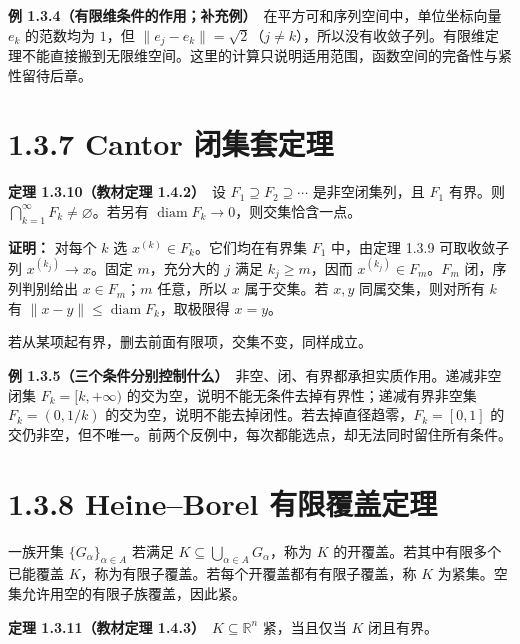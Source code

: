 \documentclass[11pt,a4paper]{article}
\begin{document}
\textbf{例
1.3.4（有限维条件的作用；补充例）}　在平方可和序列空间中，单位坐标向量
\(e_k\) 的范数均为 \(1\)，但
\(\|e_j-e_k\|=\sqrt2\)（\(j\ne k\)），所以没有收敛子列。有限维定理不能直接搬到无限维空间。这里的计算只说明适用范围，函数空间的完备性与紧性留待后章。

\section[\S{}1.3.7 Cantor
闭集套定理]{1.3.7 Cantor
闭集套定理}\label{cantor-ux95edux96c6ux5957ux5b9aux7406}

\textbf{定理 1.3.10（教材定理 1.4.2）}　设
\(F_1\supseteq F_2\supseteq\cdots\) 是非空闭集列，且 \(F_1\) 有界。则
\(\bigcap_{k=1}^\infty F_k\ne\varnothing\)。若另有
\(\operatorname{diam}F_k\to0\)，则交集恰含一点。

\textbf{证明：} 对每个 \(k\) 选 \(x^{(k)}\in F_k\)。它们均在有界集
\(F_1\) 中，由定理 1.3.9 可取收敛子列 \(x^{(k_j)}\to x\)。固定
\(m\)，充分大的 \(j\) 满足 \(k_j\geq m\)，因而
\(x^{(k_j)}\in F_m\)。\(F_m\) 闭，序列判别给出 \(x\in F_m\)；\(m\)
任意，所以 \(x\) 属于交集。若 \(x,y\) 同属交集，则对所有 \(k\) 有
\(\|x-y\|\leq\operatorname{diam}F_k\)，取极限得 \(x=y\)。

若从某项起有界，删去前面有限项，交集不变，同样成立。

\textbf{例
1.3.5（三个条件分别控制什么）}　非空、闭、有界都承担实质作用。递减非空闭集
\(F_k=[k,+\infty)\) 的交为空，说明不能无条件去掉有界性；递减有界非空集
\(F_k=(0,1/k)\)
的交为空，说明不能去掉闭性。若去掉直径趋零，\(F_k=[0,1]\)
的交仍非空，但不唯一。前两个反例中，每次都能选点，却无法同时留住所有条件。

\section[\S{}1.3.8 Heine--Borel
有限覆盖定理]{1.3.8 Heine--Borel
有限覆盖定理}\label{heineborel-ux6709ux9650ux8986ux76d6ux5b9aux7406}

一族开集 \(\{G_\alpha\}_{\alpha\in A}\) 若满足
\(K\subseteq\bigcup_{\alpha\in A}G_\alpha\)，称为 \(K\)
的开覆盖。若其中有限多个已能覆盖
\(K\)，称为有限子覆盖。若每个开覆盖都有有限子覆盖，称 \(K\)
为紧集。空集允许用空的有限子族覆盖，因此紧。

\textbf{定理 1.3.11（教材定理 1.4.3）}　\(K\subseteq\mathbb R^n\)
紧，当且仅当 \(K\) 闭且有界。
\end{document}
